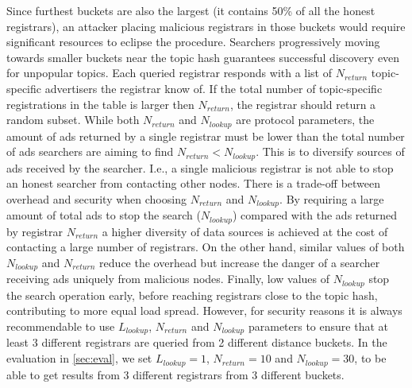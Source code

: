 Since furthest buckets are also the largest (\ie it contains 50\% of all the honest registrars), an attacker placing malicious registrars in those buckets would require significant resources to eclipse the procedure. 
Searchers progressively moving towards smaller buckets near the topic hash guarantees successful discovery even for unpopular topics.
Each queried registrar responds with a list of $N_\textit{return}$ topic-specific advertisers the registrar know of. 
If the total number of topic-specific registrations in the table is larger then
$N_\textit{return}$, the registrar should return a random subset.
While both $N_\textit{return}$ and $N_\textit{lookup}$ are protocol parameters,
the amount of ads returned by a single registrar must be lower than the total
number of ads searchers are aiming to find $N_\textit{return} <
N_\textit{lookup}$. This is to diversify sources of ads received by the searcher. I.e., a single malicious registrar is not able to stop an honest searcher from contacting other nodes.
There is a trade-off between overhead and security when choosing $N_\textit{return}$ and $N_\textit{lookup}$. 
By requiring a large amount of total ads to stop the search
($N_\textit{lookup}$) compared with the  ads returned by registrar
$N_\textit{return}$ a higher diversity of data sources is achieved at the cost of contacting a large number of registrars. On the other hand,  similar values of both $N_\textit{lookup}$ and $N_\textit{return}$ reduce the overhead but increase the danger of a searcher receiving ads uniquely from malicious nodes. Finally,  low values of $N_\textit{lookup}$ stop the search operation early,  before reaching registrars close to the topic hash, contributing to more equal load spread.
However,  for security reasons it is always recommendable to use $L_\textit{lookup}$, $N_\textit{return}$ and $N_\textit{lookup}$ parameters to ensure that at least 3 different registrars are queried from 2 different distance buckets.
In the evaluation in \cref{sec:eval},  we set $L_\textit{lookup}=1$, $N_\textit{return}=10$ and $N_\textit{lookup}=30$, to be able to get results from 3 different registrars from 3 different buckets.

